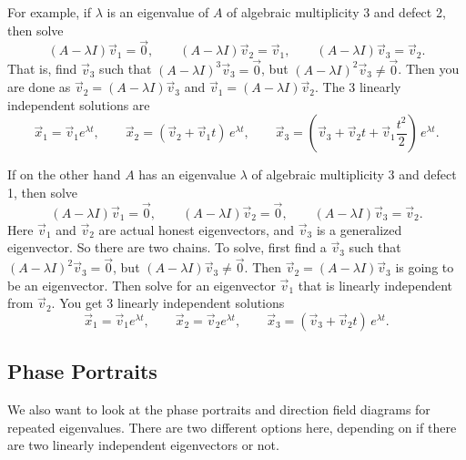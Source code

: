 For example, if $\lambda$ is an eigenvalue of $A$
of algebraic multiplicity 3 and defect 2, then solve
\begin{equation*}
(A - \lambda I) \vec{v}_1 = \vec{0} , \qquad
(A - \lambda I) \vec{v}_2 = \vec{v}_1 , \qquad
(A - \lambda I) \vec{v}_3 = \vec{v}_2 .
\end{equation*}
That is, find $\vec{v}_3$ such that 
${(A - \lambda I)}^3 \vec{v}_3 = \vec{0}$, but
${(A - \lambda I)}^2 \vec{v}_3 \not= \vec{0}$.
Then you are done as
$\vec{v}_2 = (A - \lambda I) \vec{v}_3$
and 
$\vec{v}_1 = (A - \lambda I) \vec{v}_2$.
The 3 linearly independent solutions are
\begin{equation*}
\vec{x}_1 = \vec{v}_1 e^{\lambda t} , \qquad
\vec{x}_2 = ( \vec{v}_2 + \vec{v}_1 t ) \, e^{\lambda t} , \qquad
\vec{x}_3 = \left( \vec{v}_3 + \vec{v}_2 t +
\vec{v}_{1} \frac{t^2}{2} \right) \, e^{\lambda t} .
\end{equation*}

If on the other hand $A$ has an eigenvalue $\lambda$
of algebraic multiplicity 3 and defect 1, then 
solve
\begin{equation*}
(A - \lambda I) \vec{v}_1 = \vec{0} , \qquad
(A - \lambda I) \vec{v}_2 = \vec{0} , \qquad
(A - \lambda I) \vec{v}_3 = \vec{v}_2 .
\end{equation*}
Here $\vec{v}_1$ and $\vec{v}_2$ are actual honest eigenvectors,
and $\vec{v}_3$ is a generalized eigenvector.
So there are two chains.
To solve, first find a 
$\vec{v}_3$ such that 
${(A - \lambda I)}^2 \vec{v}_3 = \vec{0}$, but
$(A - \lambda I) \vec{v}_3 \not= \vec{0}$.
Then $\vec{v}_2 = (A - \lambda I) \vec{v}_3$ is going to be an eigenvector.
Then solve for an eigenvector $\vec{v}_1$ that is linearly independent 
from $\vec{v}_2$.
You get 3 linearly independent solutions
\begin{equation*}
\vec{x}_1 = \vec{v}_1 e^{\lambda t} , \qquad
\vec{x}_2 = \vec{v}_2 e^{\lambda t} , \qquad
\vec{x}_3 = ( \vec{v}_3 + \vec{v}_2 t ) \, e^{\lambda t} .
\end{equation*}

\subsection{Phase Portraits}

We also want to look at the phase portraits and direction field diagrams for repeated eigenvalues. There are two different options here, depending on if there are two linearly independent eigenvectors or not.

